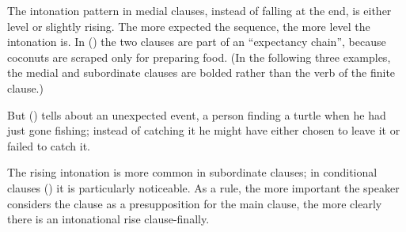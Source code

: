 The intonation pattern in medial clauses, instead of falling at the end, is either level or slightly rising.  The more expected the sequence, the more level the intonation is. In () the two clauses are part of an ``expectancy chain'', because coconuts are scraped only for preparing food. (In the following three examples, the medial and subordinate clauses are bolded rather than the verb of the finite clause.)


 


But () tells about an unexpected event, a person finding a turtle when he had just gone fishing; instead of catching it he might have either chosen to leave it or failed to catch it.

 


The rising intonation is more common in subordinate clauses; in conditional clauses () it is particularly noticeable.  As a rule, the more important the speaker considers the clause as a presupposition for the main clause, the more clearly there is an intonational rise clause-finally.  




